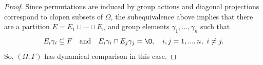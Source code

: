 \documentclass[12pt, oneside, psamsfonts]{amsart}
\newtheorem{cor}[thm]{Corollary}
\theoremstyle{definition}
\theoremstyle{remark}
\newtheorem{rem}[thm]{Remark}
\numberwithin{equation}{section}
\newcommand{\Int}{\mathbb Z}
\newcommand{\Kzero}{\textrm{K}_0}
\begin{document}
\begin{proof}
Since permutations are induced by group actions and diagonal projections correspond to clopen subsets of $\Omega$, the subequivalence above implies that there are a partition $E=E_1\sqcup \cdots \sqcup E_n$ and group elements $\gamma_1, ..., \gamma_n$ such that 
$$E_i\gamma_i \subseteq F \quad \mathrm{and} \quad E_i\gamma_i \cap E_j\gamma_j = \O, \quad i, j=1, ..., n,\ i\neq j. $$ So, $(\Omega, \Gamma)$ has dynamical comparison in this case.
\end{proof}

%
%
%
%
\end{document}
